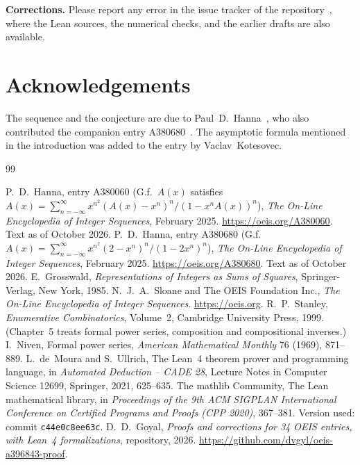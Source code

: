 \documentclass[11pt,a4paper]{article}
\theoremstyle{definition}
\theoremstyle{remark}
\newcommand{\para}[1]{\par\medskip\noindent\textbf{#1}\enspace}
\begin{document}
\para{Corrections.} Please report any error in the issue tracker of the repository~\cite{repo}, where the Lean
sources, the numerical checks, and the earlier drafts are also available.

\section*{Acknowledgements}
The sequence and the conjecture are due to Paul~D.~Hanna~\cite{oeis}, who also contributed the companion entry
A380680~\cite{oeisother}. The asymptotic formula mentioned in the introduction was added to the entry by
Vaclav~Kotesovec.

\begin{thebibliography}{99}\small
\raggedright
{} P.~D.~Hanna, entry A380060 (G.f.\ $A(x)$ satisfies $A(x)=\sum_{n=-\infty}^{\infty}x^{n^2}(A(x)-x^n)^n/(1-x^nA(x))^n$), \emph{The On-Line Encyclopedia of Integer Sequences}, February 2025. \url{https://oeis.org/A380060}. Text as of October 2026.
 P.~D.~Hanna, entry A380680 (G.f.\ $A(x)=\sum_{n=-\infty}^{\infty}x^{n^2}(2-x^n)^n/(1-2x^n)^n$), \emph{The On-Line Encyclopedia of Integer Sequences}, February 2025. \url{https://oeis.org/A380680}. Text as of October 2026.
 E.~Grosswald, \emph{Representations of Integers as Sums of Squares}, Springer-Verlag, New York, 1985.
 N.~J.~A.~Sloane and The OEIS Foundation Inc., \emph{The On-Line Encyclopedia of Integer Sequences}. \url{https://oeis.org}.
 R.~P.~Stanley, \emph{Enumerative Combinatorics}, Volume~2, Cambridge University Press, 1999. (Chapter~5 treats formal power series, composition and compositional inverses.)
 I.~Niven, Formal power series, \emph{American Mathematical Monthly} 76 (1969), 871--889.
 L.~de~Moura and S.~Ullrich, The Lean~4 theorem prover and programming language, in \emph{Automated Deduction -- CADE 28}, Lecture Notes in Computer Science 12699, Springer, 2021, 625--635.
 The mathlib Community, The Lean mathematical library, in \emph{Proceedings of the 9th ACM SIGPLAN International Conference on Certified Programs and Proofs (CPP 2020)}, 367--381. Version used: commit \texttt{c44e0c8ee63c}.
 D.~D.~Goyal, \emph{Proofs and corrections for 34 OEIS entries, with Lean~4 formalizations}, repository, 2026. \url{https://github.com/dvgyl/oeis-a396843-proof}.
\end{thebibliography}
\end{document}
